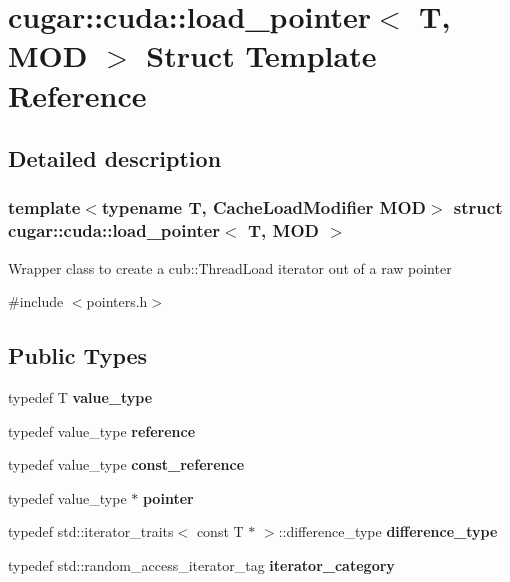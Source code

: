 \hypertarget{structcugar_1_1cuda_1_1load__pointer}{}\section{cugar\+:\+:cuda\+:\+:load\+\_\+pointer$<$ T, M\+OD $>$ Struct Template Reference}
\label{structcugar_1_1cuda_1_1load__pointer}


\subsection{Detailed description}
\subsubsection*{template$<$typename T, Cache\+Load\+Modifier M\+OD$>$\newline
struct cugar\+::cuda\+::load\+\_\+pointer$<$ T, M\+O\+D $>$}

Wrapper class to create a cub\+::\+Thread\+Load iterator out of a raw pointer 

{\ttfamily \#include $<$pointers.\+h$>$}

\subsection*{Public Types}
\begin{DoxyCompactItemize}
\item 
\mbox{\label{structcugar_1_1cuda_1_1load__pointer_ad5342d667cd2bf3a09a671d41f95bd02}} 
typedef T {\bfseries value\+\_\+type}
\item 
\mbox{\label{structcugar_1_1cuda_1_1load__pointer_a760402ce01d3fb864822ef936a53ecd8}} 
typedef value\+\_\+type {\bfseries reference}
\item 
\mbox{\label{structcugar_1_1cuda_1_1load__pointer_a77e4111ae19242253876186dea7ce7f6}} 
typedef value\+\_\+type {\bfseries const\+\_\+reference}
\item 
\mbox{\label{structcugar_1_1cuda_1_1load__pointer_a7e70a15fd36847c2839aafdea78b5cb1}} 
typedef value\+\_\+type $\ast$ {\bfseries pointer}
\item 
\mbox{\label{structcugar_1_1cuda_1_1load__pointer_a6e32c5fbeef7e45cafc81635b55463ff}} 
typedef std\+::iterator\+\_\+traits$<$ const T $\ast$ $>$\+::difference\+\_\+type {\bfseries difference\+\_\+type}
\item 
\mbox{\label{structcugar_1_1cuda_1_1load__pointer_a136446b699486eafe979c52564168e0c}} 
typedef std\+::random\+\_\+access\+\_\+iterator\+\_\+tag {\bfseries iterator\+\_\+category}
\end{DoxyCompactItemize}
